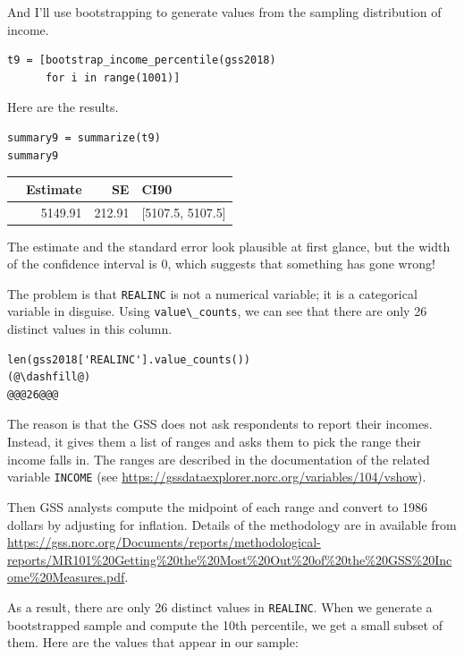 And I'll use bootstrapping to generate values from the sampling
distribution of income.

\begin{lstlisting}[]
t9 = [bootstrap_income_percentile(gss2018)
      for i in range(1001)]
\end{lstlisting}

Here are the results.

\begin{lstlisting}[]
summary9 = summarize(t9)
summary9
\end{lstlisting}

\begin{tabular}{lrrl}
\midrule
{} &  Estimate &      SE &              CI90 \\
\midrule
{} &   5149.91 &  212.91 &  [5107.5, 5107.5] \\
\midrule
\end{tabular}

The estimate and the standard error look plausible at first glance, but
the width of the confidence interval is 0, which suggests that something
has gone wrong!

The problem is that \passthrough{\lstinline!REALINC!} is not a numerical
variable; it is a categorical variable in disguise. Using
\passthrough{\lstinline!value\_counts!}, we can see that there are only
26 distinct values in this column.

\begin{lstlisting}[]
len(gss2018['REALINC'].value_counts())
(@\dashfill@)
@@@26@@@
\end{lstlisting}

The reason is that the GSS does not ask respondents to report their
incomes. Instead, it gives them a list of ranges and asks them to pick
the range their income falls in. The ranges are described in the
documentation of the related variable \passthrough{\lstinline!INCOME!}
(see \url{https://gssdataexplorer.norc.org/variables/104/vshow}).

Then GSS analysts compute the midpoint of each range and convert to 1986
dollars by adjusting for inflation. Details of the methodology are in
available from
\url{https://gss.norc.org/Documents/reports/methodological-reports/MR101\%20Getting\%20the\%20Most\%20Out\%20of\%20the\%20GSS\%20Income\%20Measures.pdf}.

As a result, there are only 26 distinct values in
\passthrough{\lstinline!REALINC!}. When we generate a bootstrapped
sample and compute the 10th percentile, we get a small subset of them.
Here are the values that appear in our sample:

